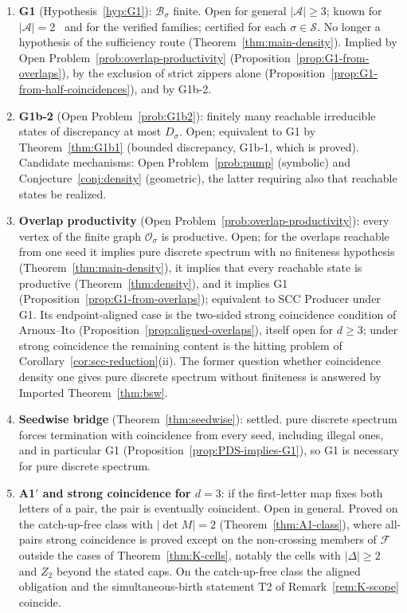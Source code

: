 \documentclass[11pt]{amsart}
\theoremstyle{plain}
\theoremstyle{definition}
\theoremstyle{remark}
\newcommand{\A}{\mathcal{A}}
\newcommand{\B}{\mathcal{B}}
\newcommand{\PDS}{pure discrete spectrum}
\begin{document}
\begin{enumerate}[leftmargin=*]
\item \textbf{G1} (Hypothesis~\ref{hyp:G1}): $\B_\sigma$ finite. Open for general $|\A|\ge3$; known for $|\A|=2$~\cite{BD,HS} and for the verified families; certified for each $\sigma\in\mathcal S$. No longer a hypothesis of the sufficiency route (Theorem~\ref{thm:main-density}). Implied by Open Problem~\ref{prob:overlap-productivity} (Proposition~\ref{prop:G1-from-overlaps}), by the exclusion of strict zippers alone (Proposition~\ref{prop:G1-from-half-coincidences}), and by G1b-2.
\item \textbf{G1b-2} (Open Problem~\ref{prob:G1b2}): finitely many reachable irreducible states of discrepancy at most $D_\sigma$. Open; equivalent to G1 by Theorem~\ref{thm:G1b1} (bounded discrepancy, G1b-1, which is proved). Candidate mechanisms: Open Problem~\ref{prob:pump} (symbolic) and Conjecture~\ref{conj:density} (geometric), the latter requiring also that reachable states be realized.
\item \textbf{Overlap productivity} (Open Problem~\ref{prob:overlap-productivity}): every vertex of the finite graph $\mathcal O_\sigma$ is productive. Open; for the overlaps reachable from one seed it implies \PDS{} with no finiteness hypothesis (Theorem~\ref{thm:main-density}), it implies that every reachable state is productive (Theorem~\ref{thm:density}), and it implies G1 (Proposition~\ref{prop:G1-from-overlaps}); equivalent to SCC Producer under G1. Its endpoint-aligned case is the two-sided strong coincidence condition of Arnoux--Ito (Proposition~\ref{prop:aligned-overlaps}), itself open for $d\ge3$; under strong coincidence the remaining content is the hitting problem of Corollary~\ref{cor:scc-reduction}(ii). The former question whether coincidence density one gives \PDS{} without finiteness is answered by Imported Theorem~\ref{thm:bsw}.
\item \textbf{Seedwise bridge} (Theorem~\ref{thm:seedwise}): settled. \PDS{} forces termination with coincidence from every seed, including illegal ones, and in particular G1 (Proposition~\ref{prop:PDS-implies-G1}), so G1 is necessary for \PDS{}.
\item \textbf{A1$'$ and strong coincidence for $d=3$}: if the first-letter map fixes both letters of a pair, the pair is eventually coincident. Open in general. Proved on the catch-up-free class with $|\det M|=2$ (Theorem~\ref{thm:A1-class}), where all-pairs strong coincidence is proved except on the non-crossing members of $\mathcal F$ outside the cases of Theorem~\ref{thm:K-cells}, notably the cells with $|\Delta|\ge2$ and $Z_2$ beyond the stated caps. On the catch-up-free class the aligned obligation and the simultaneous-birth statement T2 of Remark~\ref{rem:K-scope} coincide.

\end{enumerate}
\end{document}
